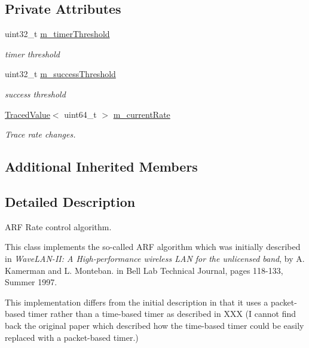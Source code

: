 \subsection*{Private Attributes}
\begin{DoxyCompactItemize}
\item 
uint32\+\_\+t \hyperlink{classns3_1_1ArfWifiManager_ab5925d5bdf91969c526dc9dd00dc0856}{m\+\_\+timer\+Threshold}
\begin{DoxyCompactList}\small\item\em timer threshold \end{DoxyCompactList}\item 
uint32\+\_\+t \hyperlink{classns3_1_1ArfWifiManager_a6ec0b16b55aa4c35686b4ab5bd61240d}{m\+\_\+success\+Threshold}
\begin{DoxyCompactList}\small\item\em success threshold \end{DoxyCompactList}\item 
\hyperlink{classns3_1_1TracedValue}{Traced\+Value}$<$ uint64\+\_\+t $>$ \hyperlink{classns3_1_1ArfWifiManager_afda32f9ba0ac3498046851561ae7ed30}{m\+\_\+current\+Rate}
\begin{DoxyCompactList}\small\item\em Trace rate changes. \end{DoxyCompactList}\end{DoxyCompactItemize}
\subsection*{Additional Inherited Members}


\subsection{Detailed Description}
A\+RF Rate control algorithm. 

This class implements the so-\/called A\+RF algorithm which was initially described in {\itshape Wave\+L\+A\+N-\/\+II\+: A High-\/performance wireless L\+AN for the unlicensed band}, by A. Kamerman and L. Monteban. in Bell Lab Technical Journal, pages 118-\/133, Summer 1997.

This implementation differs from the initial description in that it uses a packet-\/based timer rather than a time-\/based timer as described in X\+XX (I cannot find back the original paper which described how the time-\/based timer could be easily replaced with a packet-\/based timer.)

